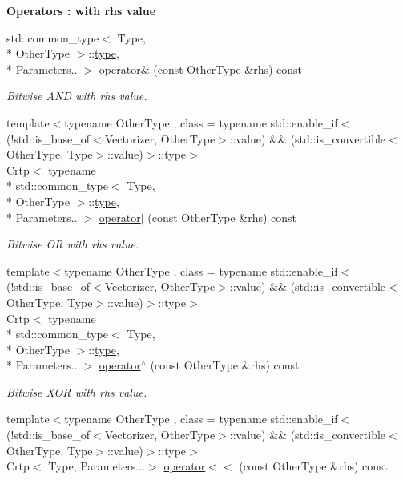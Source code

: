 \begin{Indent}{\bf Operators \-: with rhs value}
\begin{DoxyCompactItemize}
std\-::common\-\_\-type$<$ Type, \\*
Other\-Type $>$\-::\hyperlink{classmagrathea_1_1StaticVectorizer_a28c393a3896a3e839008c35d56b10a54}{type}, \\*
Parameters...$>$ \hyperlink{classmagrathea_1_1StaticVectorizer_add90cf869ac9dd08b986be67cfee5221}{operator\&} (const Other\-Type \&rhs) const 
\begin{DoxyCompactList}\small\item\em Bitwise A\-N\-D with rhs value. \end{DoxyCompactList}\item 
{\footnotesize template$<$typename Other\-Type , class  = typename std\-::enable\-\_\-if$<$(!std\-::is\-\_\-base\-\_\-of$<$\-Vectorizer, Other\-Type$>$\-::value) \&\& (std\-::is\-\_\-convertible$<$\-Other\-Type, Type$>$\-::value)$>$\-::type$>$ }\\Crtp$<$ typename \\*
std\-::common\-\_\-type$<$ Type, \\*
Other\-Type $>$\-::\hyperlink{classmagrathea_1_1StaticVectorizer_a28c393a3896a3e839008c35d56b10a54}{type}, \\*
Parameters...$>$ \hyperlink{classmagrathea_1_1StaticVectorizer_a224cb7cb9b2cb80a7719cdee76349204}{operator$|$} (const Other\-Type \&rhs) const 
\begin{DoxyCompactList}\small\item\em Bitwise O\-R with rhs value. \end{DoxyCompactList}\item 
{\footnotesize template$<$typename Other\-Type , class  = typename std\-::enable\-\_\-if$<$(!std\-::is\-\_\-base\-\_\-of$<$\-Vectorizer, Other\-Type$>$\-::value) \&\& (std\-::is\-\_\-convertible$<$\-Other\-Type, Type$>$\-::value)$>$\-::type$>$ }\\Crtp$<$ typename \\*
std\-::common\-\_\-type$<$ Type, \\*
Other\-Type $>$\-::\hyperlink{classmagrathea_1_1StaticVectorizer_a28c393a3896a3e839008c35d56b10a54}{type}, \\*
Parameters...$>$ \hyperlink{classmagrathea_1_1StaticVectorizer_ab39f76f560714379beb563a6406713ae}{operator$^\wedge$} (const Other\-Type \&rhs) const 
\begin{DoxyCompactList}\small\item\em Bitwise X\-O\-R with rhs value. \end{DoxyCompactList}\item 
{\footnotesize template$<$typename Other\-Type , class  = typename std\-::enable\-\_\-if$<$(!std\-::is\-\_\-base\-\_\-of$<$\-Vectorizer, Other\-Type$>$\-::value) \&\& (std\-::is\-\_\-convertible$<$\-Other\-Type, Type$>$\-::value)$>$\-::type$>$ }\\Crtp$<$ Type, Parameters...$>$ \hyperlink{classmagrathea_1_1StaticVectorizer_a5629b7a221887ce68ed18b1da00ad5d6}{operator$<$$<$} (const Other\-Type \&rhs) const 

\end{DoxyCompactItemize}
\end{Indent}
